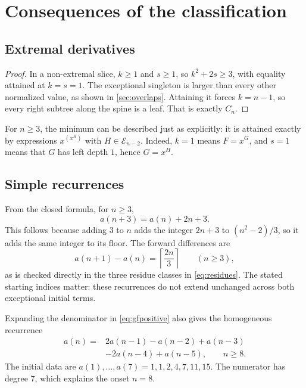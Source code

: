 \documentclass[11pt,letterpaper]{article}
\numberwithin{equation}{section}
\newtheorem{corollary}[theorem]{Corollary}
\theoremstyle{definition}
\theoremstyle{remark}
\newcommand{\E}{\mathcal E}
\newcommand{\Dset}{\mathcal D}
\begin{document}
\section{Consequences of the classification}
\label{sec:consequences}
\subsection{Extremal derivatives}
\begin{proof}
In a non-extremal slice, $k\ge1$ and $s\ge1$, so
$k^2+2s\ge3$, with equality attained at $k=s=1$.
The exceptional singleton is larger than every other normalized
value, as shown in \cref{sec:overlaps}. Attaining it forces
$k=n-1$, so every right subtree along the spine is a leaf.
That is exactly $C_n$.
\end{proof}

For $n\ge3$, the minimum can be described just as explicitly:
it is attained exactly by expressions $x^{(x^H)}$ with
$H\in\E_{n-2}$. Indeed, $k=1$ means $F=x^G$, and $s=1$ means that
$G$ has left depth $1$, hence $G=x^H$.

\subsection{Simple recurrences}
From the closed formula, for $n\ge3$,
\begin{equation}\label{eq:step3}
 a(n+3)=a(n)+2n+3.
\end{equation}
This follows because adding $3$ to $n$ adds the integer $2n+3$
to $(n^2-2)/3$, so it adds the same integer to its floor.
The forward differences are
\begin{equation}\label{eq:step1}
 a(n+1)-a(n)=\left\lceil\frac{2n}{3}\right\rceil
 \qquad(n\ge3),
\end{equation}
as is checked directly in the three residue classes in
\eqref{eq:residues}.
The stated starting indices matter: these recurrences do not extend
unchanged across both exceptional initial terms.

Expanding the denominator in \eqref{eq:gfpositive} also gives the
homogeneous recurrence
\begin{equation}\label{eq:order5}
 \begin{split}
 a(n)={}&2a(n-1)-a(n-2)+a(n-3)\\
        &-2a(n-4)+a(n-5),\qquad n\ge8.
 \end{split}
\end{equation}
The initial data are
$a(1),\ldots,a(7)=1,1,2,4,7,11,15$.
The numerator has degree $7$, which explains the onset $n=8$.
\end{document}

